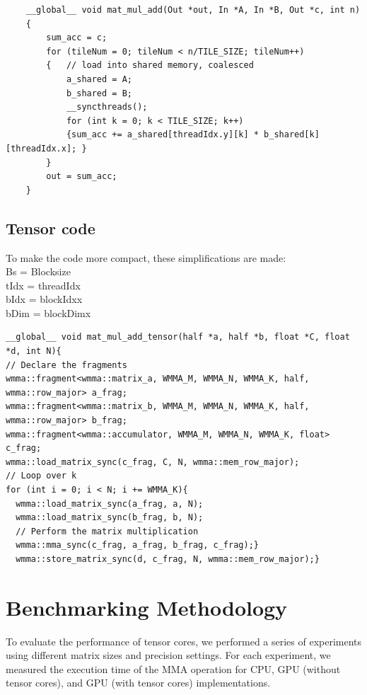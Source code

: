 \documentclass[conference]{IEEEtran}
\begin{document}
  \begin{lstlisting}
    __global__ void mat_mul_add(Out *out, In *A, In *B, Out *c, int n)
    {   
        sum_acc = c;
        for (tileNum = 0; tileNum < n/TILE_SIZE; tileNum++)
        {   // load into shared memory, coalesced
            a_shared = A;
            b_shared = B;
            __syncthreads();
            for (int k = 0; k < TILE_SIZE; k++)
            {sum_acc += a_shared[threadIdx.y][k] * b_shared[k][threadIdx.x]; }
        }
        out = sum_acc;
    }   
  \end{lstlisting}
  
  
  \subsection{Tensor code}\label{sec:TensorCode}
  To make the code more compact, these simplifications are made:\\
  Bs = Blocksize \\
  tIdx = threadIdx \\
  bIdx = blockIdxx \\
  bDim = blockDimx

  \begin{lstlisting}
__global__ void mat_mul_add_tensor(half *a, half *b, float *C, float *d, int N){
// Declare the fragments
wmma::fragment<wmma::matrix_a, WMMA_M, WMMA_N, WMMA_K, half, wmma::row_major> a_frag;
wmma::fragment<wmma::matrix_b, WMMA_M, WMMA_N, WMMA_K, half, wmma::row_major> b_frag;
wmma::fragment<wmma::accumulator, WMMA_M, WMMA_N, WMMA_K, float> c_frag;
wmma::load_matrix_sync(c_frag, C, N, wmma::mem_row_major);
// Loop over k
for (int i = 0; i < N; i += WMMA_K){
  wmma::load_matrix_sync(a_frag, a, N);
  wmma::load_matrix_sync(b_frag, b, N);
  // Perform the matrix multiplication
  wmma::mma_sync(c_frag, a_frag, b_frag, c_frag);}
  wmma::store_matrix_sync(d, c_frag, N, wmma::mem_row_major);}
  \end{lstlisting}


  \section{Benchmarking Methodology}\label{sec:benchmarking-methodology}
  
  To evaluate the performance of tensor cores, we performed a series of experiments using different 
  matrix sizes and precision settings. For each experiment, we measured the execution time of the 
  MMA operation for CPU, GPU (without tensor cores), and GPU (with tensor cores) implementations.
  
\end{document}
